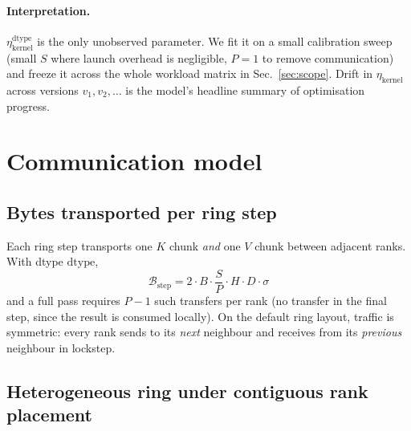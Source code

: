 \documentclass[11pt]{article}
\newcommand{\step}{\mathrm{step}}
\newcommand{\dtype}{\mathrm{dtype}}
\newcommand{\Bd}{\sigma}        %
\begin{document}
\paragraph{Interpretation.} $\eta_{\text{kernel}}^\dtype$ is the only
unobserved parameter. We fit it on a small calibration sweep
(small $S$ where launch overhead is negligible, $P = 1$ to remove
communication) and freeze it across the whole workload matrix in
Sec.~\ref{sec:scope}. Drift in $\eta_{\text{kernel}}$ across versions
$v_1, v_2, \dots$ is the model's headline summary of optimisation
progress.

\section{Communication model}
\label{sec:comm}

\subsection{Bytes transported per ring step}

Each ring step transports one $K$ chunk \emph{and} one $V$ chunk
between adjacent ranks. With dtype $\dtype$,
\begin{equation}
  \mathcal{B}_\step
  = 2 \cdot B \cdot \frac{S}{P} \cdot H \cdot D \cdot \Bd
  \label{eq:bytes_step}
\end{equation}
and a full pass requires $P - 1$ such transfers per rank (no transfer
in the final step, since the result is consumed locally). On the
default ring layout, traffic is symmetric: every rank sends to its
\emph{next} neighbour and receives from its \emph{previous} neighbour
in lockstep.

\subsection{Heterogeneous ring under contiguous rank placement}
\end{document}
